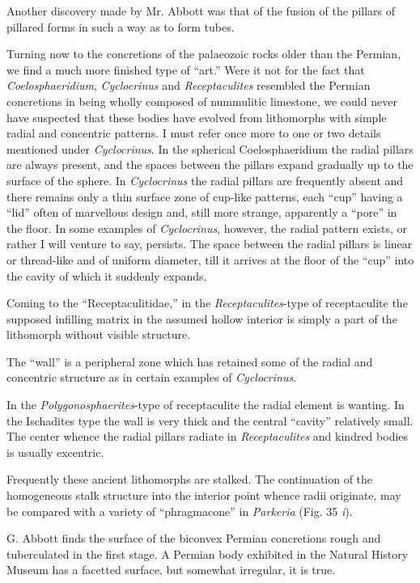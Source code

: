 \documentclass[a4paper, 12pt, oneside]{article}
\begin{document}
Another discovery made by Mr. Abbott was that of the fusion of the pillars of pillared forms in such a way as to form tubes.

Turning now to the concretions of the palaeozoic rocks older than the Permian, we find a much more finished type of ``art.'' Were it not for the fact that \emph{Coelosphaeridium}, \emph{Cyclocrinus} and \emph{Receptaculites} resembled the Permian concretions in being wholly composed of nummulitic limestone, we could never have suspected that these bodies have evolved from lithomorphs with simple radial and concentric patterns. I must refer once more to one or two details mentioned under \emph{Cyclocrinus}. In the spherical Coelosphaeridium the radial pillars are always present, and the spaces between the pillars expand gradually up to the surface of the sphere. In \emph{Cyclocrinus} the radial pillars are frequently absent and there remains only a thin surface zone of cup-like patterns, each ``cup'' having a ``lid'' often of marvellous design and, still more strange, apparently a ``pore'' in the floor. In some examples of \emph{Cyclocrinus}, however, the radial pattern exists, or rather I will venture to say, persists. The space between the radial pillars is linear or thread-like and of uniform diameter, till it arrives at the floor of the ``cup'' into the cavity of which it suddenly expands.

Coming to the ``Receptaculitidae,'' in the \emph{Receptaculites}-type of receptaculite the supposed infilling matrix in the assumed hollow interior is simply a part of the lithomorph without visible structure.

The ``wall'' is a peripheral zone which has retained some of the radial and concentric structure as in certain examples of \emph{Cyclocrinus}.

In the \emph{Polygonosphaerites}-type of receptaculite the radial element is wanting. In the Ischadites type the wall is very thick and the central ``cavity'' relatively small. The center whence the radial pillars radiate in \emph{Receptaculites} and kindred bodies is usually excentric.

Frequently these ancient lithomorphs are stalked. The continuation of the homogeneous stalk structure into the interior point whence radii originate, may be compared with a variety of ``phragmacone'' in \emph{Parkeria} (Fig. 35 \emph{i}).

G. Abbott finds the surface of the biconvex Permian concretions rough and tuberculated in the first stage. A Permian body exhibited in the Natural History Museum has a facetted surface, but somewhat irregular, it is true.
\end{document}
